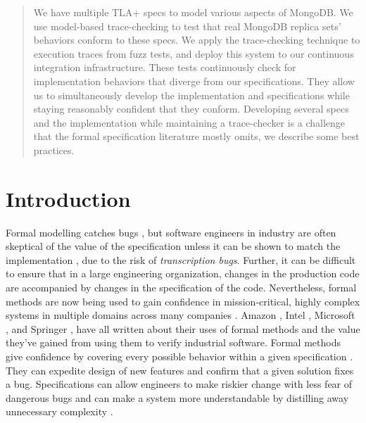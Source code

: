 \documentclass{vldb}
\begin{document}


\maketitle

\begin{abstract}
We have multiple TLA+ specs to model various aspects of MongoDB. We use model-based trace-checking to test that real MongoDB replica sets' behaviors conform to these specs.
We apply the trace-checking technique to execution traces from fuzz tests, and deploy this system to our continuous integration infrastructure.
These tests continuously check for implementation behaviors that diverge from our specifications.
They allow us to simultaneously develop the implementation and specifications while staying reasonably confident that they conform.
Developing several specs and the implementation while maintaining a trace-checker is a challenge that the formal specification literature mostly omits, we describe some best practices.
\end{abstract}

\section{Introduction}

Formal modelling catches bugs \cite{Newcombe2014UseOfFormalMethodsAmazon}, but software engineers in industry are often skeptical of the value of the specification unless it can be shown to match the implementation \cite{Wayne18AgileFormalMethods, Newcombe2014UseOfFormalMethodsAmazon}, due to the risk of \textit{transcription bugs}. 
Further, it can be difficult to ensure that in a large engineering organization, changes in the production code are accompanied by changes in the specification of the code.
Nevertheless, formal methods are now being used to gain confidence in mission-critical, highly complex systems in multiple domains across many companies \cite{Tasiran03AlphaMicroprocessor}. 
Amazon \cite{Newcombe2014UseOfFormalMethodsAmazon, Chudnov18AmazonS2N, Cook18SecurityAWS}, Intel \cite{Kaivola09IntelI7, Beers08IntelExperience}, Microsoft \cite{Shukla18AzureCosmosDB}, and Springer \cite{Neubauer12AutomatedContinuousQualityAssurance}, have all written about their uses of formal methods and the value they've gained from using them to verify industrial software. 
Formal methods give confidence by covering every possible behavior within a given specification \cite{Kaivola09IntelI7}. 
They can expedite design of new features and confirm that a given solution fixes a bug. 
Specifications can allow engineers to make riskier change with less fear of dangerous bugs and can make a system more understandable by distilling away unnecessary complexity  \cite{Newcombe2014UseOfFormalMethodsAmazon}.
\end{document}
